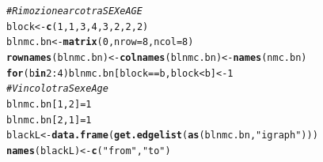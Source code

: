 \documentclass{article}\usepackage[]{graphicx}\usepackage[]{xcolor}
\makeatletter
\newcommand{\hlnum}[1]{\textcolor[rgb]{0.686,0.059,0.569}{#1}}%
\newcommand{\hlstr}[1]{\textcolor[rgb]{0.192,0.494,0.8}{#1}}%
\newcommand{\hlcom}[1]{\textcolor[rgb]{0.678,0.584,0.686}{\textit{#1}}}%
\newcommand{\hlopt}[1]{\textcolor[rgb]{0,0,0}{#1}}%
\newcommand{\hlstd}[1]{\textcolor[rgb]{0.345,0.345,0.345}{#1}}%
\newcommand{\hlkwa}[1]{\textcolor[rgb]{0.161,0.373,0.58}{\textbf{#1}}}%
\newcommand{\hlkwb}[1]{\textcolor[rgb]{0.69,0.353,0.396}{#1}}%
\newcommand{\hlkwc}[1]{\textcolor[rgb]{0.333,0.667,0.333}{#1}}%
\newcommand{\hlkwd}[1]{\textcolor[rgb]{0.737,0.353,0.396}{\textbf{#1}}}%
\newenvironment{kframe}{%
 \def\at@end@of@kframe{}%
 \ifinner\ifhmode%
  \def\at@end@of@kframe{\end{minipage}}%
  \begin{minipage}{\columnwidth}%
 \fi\fi%
 \def\FrameCommand##1{\hskip\@totalleftmargin \hskip-\fboxsep
 \colorbox{shadecolor}{##1}\hskip-\fboxsep
     \hskip-\linewidth \hskip-\@totalleftmargin \hskip\columnwidth}%
 \MakeFramed {\advance\hsize-\width
   \@totalleftmargin\z@ \linewidth\hsize
   \@setminipage}}%
 {\par\unskip\endMakeFramed%
 \at@end@of@kframe}
\newenvironment{knitrout}{}{} %
\makeatother
\begin{document}
\begin{knitrout}
\color{fgcolor}\begin{kframe}
\begin{alltt}
\hlcom{#Rimozione arco tra SEX e AGE}
\hlstd{block}\hlkwb{<-}\hlkwd{c}\hlstd{(}\hlnum{1}\hlstd{,} \hlnum{1}\hlstd{,} \hlnum{3}\hlstd{,} \hlnum{4}\hlstd{,} \hlnum{3}\hlstd{,} \hlnum{2}\hlstd{,} \hlnum{2}\hlstd{,} \hlnum{2}\hlstd{)}
\hlstd{blnmc.bn} \hlkwb{<-} \hlkwd{matrix}\hlstd{(}\hlnum{0}\hlstd{,} \hlkwc{nrow}\hlstd{=}\hlnum{8}\hlstd{,} \hlkwc{ncol}\hlstd{=}\hlnum{8}\hlstd{)}
\hlkwd{rownames}\hlstd{(blnmc.bn)} \hlkwb{<-} \hlkwd{colnames}\hlstd{(blnmc.bn)} \hlkwb{<-} \hlkwd{names}\hlstd{(nmc.bn)}
\hlkwa{for} \hlstd{(b} \hlkwa{in} \hlnum{2}\hlopt{:}\hlnum{4}\hlstd{) blnmc.bn[block}\hlopt{==}\hlstd{b, block}\hlopt{<}\hlstd{b]} \hlkwb{<-} \hlnum{1}
\hlcom{#Vincolo tra Sex e Age}
\hlstd{blnmc.bn[}\hlnum{1}\hlstd{,}\hlnum{2}\hlstd{]} \hlkwb{=} \hlnum{1}
\hlstd{blnmc.bn[}\hlnum{2}\hlstd{,}\hlnum{1}\hlstd{]} \hlkwb{=} \hlnum{1}
\hlstd{blackL} \hlkwb{<-} \hlkwd{data.frame}\hlstd{(}\hlkwd{get.edgelist}\hlstd{(}\hlkwd{as}\hlstd{(blnmc.bn,} \hlstr{"igraph"}\hlstd{)))}
\hlkwd{names}\hlstd{(blackL)} \hlkwb{<-} \hlkwd{c}\hlstd{(}\hlstr{"from"}\hlstd{,} \hlstr{"to"}\hlstd{)}
\end{alltt}
\end{kframe}
\end{knitrout}
  
\end{document}

